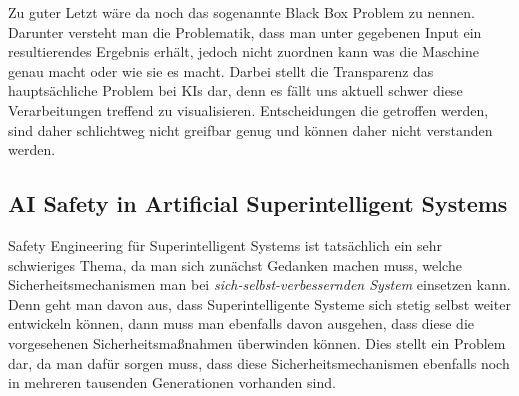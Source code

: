         Zu guter Letzt wäre da noch das sogenannte Black Box Problem zu nennen. Darunter versteht man die Problematik,
        dass man unter gegebenen Input ein resultierendes Ergebnis erhält, jedoch nicht zuordnen kann was die Maschine
        genau macht oder wie sie es macht. \cite{zednik2019solving} Darbei stellt die Transparenz das hauptsächliche
        Problem bei KIs dar, denn es fällt uns aktuell schwer diese Verarbeitungen treffend zu visualisieren.
        Entscheidungen die getroffen werden, sind daher schlichtweg nicht greifbar genug und können daher nicht verstanden
        werden.

        \subsection{AI Safety in Artificial Superintelligent Systems}

        Safety Engineering für Superintelligent Systems ist tatsächlich ein sehr schwieriges Thema, da man sich
        zunächst Gedanken machen muss, welche Sicherheitsmechanismen man bei \textit{sich-selbst-verbessernden System}
        einsetzen kann.\cite[s. 9]{yampolskiy2013safety} Denn geht man davon aus, dass Superintelligente Systeme sich
        stetig selbst weiter entwickeln können, dann muss man ebenfalls davon ausgehen, dass diese die vorgesehenen
        Sicherheitsmaßnahmen überwinden können. Dies stellt ein Problem dar, da man dafür sorgen muss, dass diese
        Sicherheitsmechanismen ebenfalls noch in mehreren tausenden Generationen vorhanden sind.

